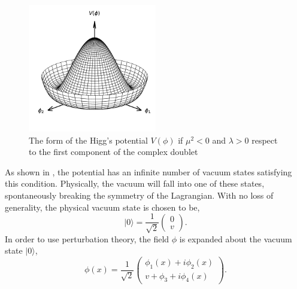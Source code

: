 \begin{figure}[h]
	\centering
	\includegraphics[width=0.5\textwidth]{Figures/standard_model/mexican_hat_potential}
	\caption{The form of the Higg's potential $V(\phi)$ if $\mu^2 < 0$ and $\lambda > 0$ respect to the first component of the complex doublet}
	\label{fig:mexican_hat}
\end{figure}

As shown in , the potential has an infinite number of vacuum states satisfying this condition.
Physically, the vacuum will fall into one of these states, spontaneously breaking the symmetry of the Lagrangian.
With no loss of generality, the physical vacuum state is chosen to be,
\begin{equation}
	\label{eq:higgs_vacuum}
	| 0 \rangle	= \frac{1}{\sqrt{2}} \begin{pmatrix} 0 \\ v \end{pmatrix}.
\end{equation}
In order to use perturbation theory, the field $\phi$ is expanded about the vacuum state $|0\rangle$,
\begin{equation}
	\phi(x) = \frac{1}{\sqrt{2}} \begin{pmatrix} \phi_1(x) + i \phi_2(x) \\ v + \phi_3 + i \phi_4(x) \end{pmatrix}.
\end{equation}

